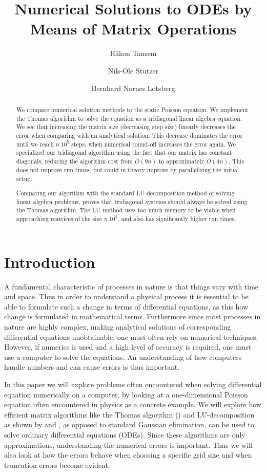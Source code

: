 \documentclass[twocolumn]{aastex62}
\begin{document}
\title{\Large Numerical Solutions to ODEs by Means of Matrix Operations}




\author{Håkon Tansem}

\author{Nils-Ole Stutzer}

\author{Bernhard Nornes Lotsberg}

\begin{abstract}
We compare numerical solution methods to the static Poisson equation. We implement the Thomas algorithm to solve the equation as a tridiagonal linear algebra equation. We see that increasing the matrix size (decreasing step size) linearly decreases the error when comparing with an analytical solution. This decrease dominates the error until we reach $n~10^5$ steps, when numerical round-off increases the error again. We specialized our tridiagonal algorithm using the fact that our matrix has constant diagonals, reducing the algorithm cost from $O(9n)$ to approximately $O(4n)$. This does not improve run-times, but could in theory improve by parallelizing the initial setup. 

Comparing our algorithm with the standard LU-decomposition method of solving linear algebra problems, proves that tridiagonal systems should always be solved  using the Thomas algorithm. The LU-method uses too much memory to be viable when approaching matrices of the size $n~10^5$, and also has significantly higher run times.
\end{abstract}

\section{Introduction} \label{sec:intro}
A fundamental characteristic of processes in nature is that things vary with time and space. Thus in order to understand a physical process it is essential to be able to formulate such a change in terms of differential equations, as this how change is formulated in mathematical terms. Furthermore since most processes in nature are highly complex, making analytical solutions of corresponding differential equations unobtainable, one must often rely on numerical techniques. However, if numerics is used and a high level of accuracy is required, one must use a computer to solve the equations. An understanding of how computers handle numbers and can cause errors is thus important.

In this paper we will explore problems often encountered when solving differential equation numerically on a computer, by looking at a one-dimensional Poisson equation often encountered in physics as a concrete example. We will explore how efficient matrix algorithms like the Thomas algorithm (\citep{Thomas:1949}) and LU-decomposition as shown by \citep[p.142]{lay:2015} and \citep[p.668]{Boyd:2004}, as opposed to standard Gaussian elimination, can be used to solve ordinary differential equations (ODEs). Since these algorithms are only approximations, understanding the numerical errors is important. Thus we will also look at how the errors behave when choosing a specific grid size and when truncation errors become evident.   
 
\end{document}
